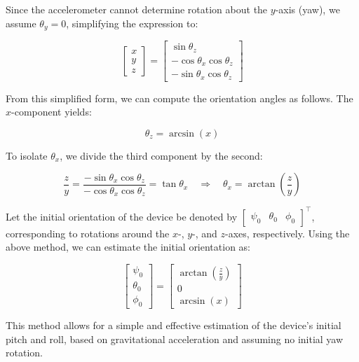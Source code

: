 \documentclass{article}
\begin{document}
Since the accelerometer cannot determine rotation about the $y$-axis (yaw), we assume $\theta_y = 0$, simplifying the expression to:

\[
\begin{bmatrix}
x\\
y\\
z
\end{bmatrix}
=
\begin{bmatrix}
\sin\theta_z \\
-\cos\theta_x \cos\theta_z \\
-\sin\theta_x \cos\theta_z
\end{bmatrix}
\]

From this simplified form, we can compute the orientation angles as follows. The $x$-component yields:

\[
\theta_z = \arcsin(x)
\]

To isolate $\theta_x$, we divide the third component by the second:

\[
\frac{z}{y} = \frac{-\sin\theta_x \cos\theta_z}{-\cos\theta_x \cos\theta_z} = \tan\theta_x \quad \Rightarrow \quad \theta_x = \arctan\left(\frac{z}{y}\right)
\]

Let the initial orientation of the device be denoted by $\begin{bmatrix} \psi_0 & \theta_0 & \phi_0 \end{bmatrix}^\top$, corresponding to rotations around the $x$-, $y$-, and $z$-axes, respectively. Using the above method, we can estimate the initial orientation as:

\[
\begin{bmatrix}
\psi_0 \\
\theta_0 \\
\phi_0
\end{bmatrix}
=
\begin{bmatrix}
\arctan\left(\frac{z}{y}\right) \\
0 \\
\arcsin(x)
\end{bmatrix}
\]

This method allows for a simple and effective estimation of the device’s initial pitch and roll, based on gravitational acceleration and assuming no initial yaw rotation.
\end{document}
